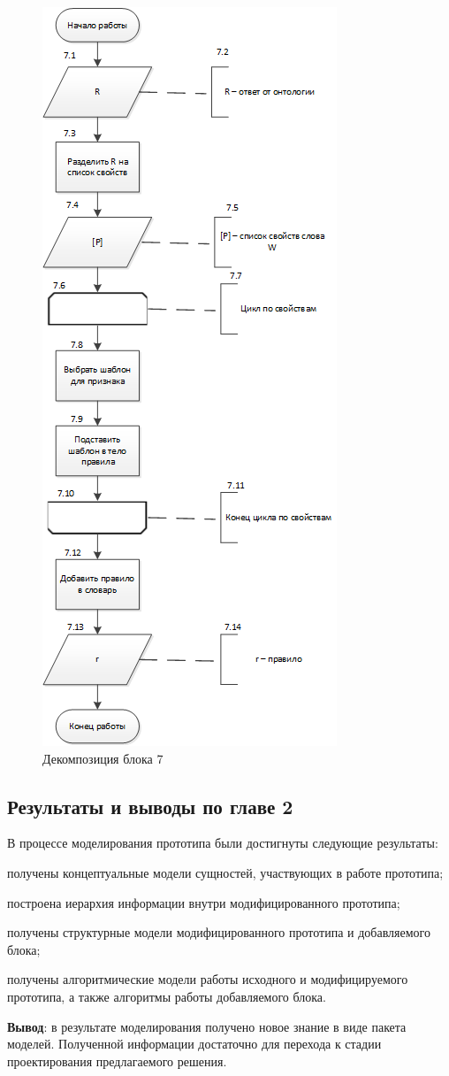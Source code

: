 \begin{figure}[H]
	\centering
		\includegraphics[scale=1.0]{images/decomposedalgorithm2.png}
	\caption{\small Декомпозиция блока 7}
	\label{fig:decomposedalgorithm2}
\end{figure}

\subsection{Результаты и выводы по главе 2}

В процессе моделирования прототипа были достигнуты следующие результаты:
\begin{list}{}{\leftmargin=1.5cm}
	\item получены концептуальные модели сущностей, участвующих в работе прототипа;
	\item построена иерархия информации внутри модифицированного прототипа;
	\item получены структурные модели модифицированного прототипа и добавляемого блока;
	\item получены алгоритмические модели работы исходного и модифицируемого прототипа, а также алгоритмы работы добавляемого блока.
\end{list}

\textbf{Вывод}: в результате моделирования получено новое знание в виде пакета моделей. Полученной информации достаточно для перехода к стадии проектирования предлагаемого решения.

